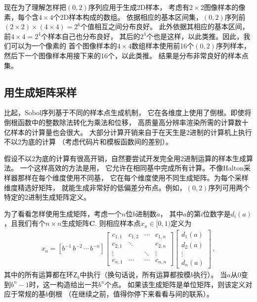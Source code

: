 现在为了理解怎样把$(0,2)$序列应用于生成2D样本，
考虑有$2\times2$图像样本的像素，每个含$4\times4$个2D样本构成的数组。
依据相应的基本区间集，$(0,2)$序列前$(2\times2)\times(4\times4)=2^6$个值相互之间分布良好。
此外依据其相应的基本区间，前$4\times4=2^4$个样本自己也分布良好，
其后的$2^4$个也是这样，以此类推。因此，我们可以为一个像素的
首个图像样本的$4\times4$数组样本使用前16个$(0,2)$序列样本，
然后下一个图像样本用接下来的16个，以此类推。
结果是分布非常良好的样本点集。

\subsection{用生成矩阵采样}\label{sub:用生成矩阵采样}
比起，Sobol序列基于不同的样本点生成机制，
它在各维度上使用了倒根。即使将倒根函数中的整数除法转化为乘法和位移，
高质量高分辨率渲染所需的计算数十亿样本的计算量也会很大。
大部分计算开销来自于在天生是2进制的计算机上执行不以2为底的计算
（考虑代码片和模板函数间的差别）。

假设不以2为底的计算有很高开销，自然要尝试开发完全用2进制运算的样本生成算法。
一个这样高效的方法是用，
它允许在相同基中完成所有计算。不像Halton采样器那样在每个维度使用不同基，
它在每个维度使用不同生成矩阵。为每个采样维度精选好矩阵，
就能生成非常好的低偏差分布点。例如，$(0,2)$序列可用两个特定的2进制生成矩阵定义。

为了看看怎样使用生成矩阵，考虑一个$n$位$b$进制数$a$，
其中$a$的第$i$位数字是$d_i(a)$，且我们有个$n\times n$生成矩阵$\bm C$.
则相应样本点$x_a\in[0,1)$定义为
\begin{align}\label{eq:7.9}
    x_a=[b^{-1}\,b^{-2}\, \cdots\,b^{-n}]\left[
        \begin{array}{cccc}
            c_{1,1} & c_{1,2} & \cdots & c_{1,n} \\
            c_{2,1} & \ddots  &        & c_{2,n} \\
            \vdots  &         & \ddots & \vdots  \\
            c_{n,1} & \cdots  & \cdots & c_{n,n}
        \end{array}
        \right]
    \left[
        \begin{array}{c}
            d_1(a) \\
            d_2(a) \\
            \vdots \\
            d_n(a)
        \end{array}
        \right]\, ,
\end{align}
其中的所有运算都在环$\mathsf{Z}_b$中执行（换句话说，所有运算都按模$b$执行）。
当$a$从0变到$b^n-1$时，这一构造给出一共$b^n$个点。
如果该生成矩阵是单位矩阵，则该定义对应于常规的基$b$倒根
（在继续之前，值得你停下来看看与间的联系）。

